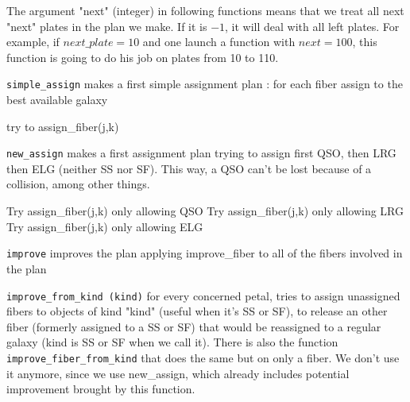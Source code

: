 \documentclass{article}
\begin{document}
The argument "next" (integer) in following functions means that we treat all next "next" plates in the plan we make. If it is $-1$, it will deal with all left plates. For example, if $next\_plate = 10$ and one launch a function with $next = 100$, this function is going to do his job on plates from 10 to 110.

{\tt simple\_assign} makes a first simple assignment plan : for each fiber assign to the best available galaxy

\begin{algorithm}[H]
	\caption{Simple\_assign(j0,n)}\label{euclid}
	\begin{algorithmic}[1]
		\State try to assign\_fiber(j,k)
		\EndFor
		\EndFor
	\end{algorithmic}
\end{algorithm}

{\tt new\_assign} makes a first assignment plan trying to assign first QSO, then LRG then ELG (neither SS nor SF). This way, a QSO can't be lost because of a collision, among other things.

\begin{algorithm}[H]
	\caption{New\_assign\_fibers(j0,n)}\label{euclid}
	\begin{algorithmic}[1]
		\State Try assign\_fiber(j,k) only allowing QSO
		\EndFor
		\State Try assign\_fiber(j,k) only allowing LRG
		\EndFor
		\State Try assign\_fiber(j,k) only allowing ELG
		\EndFor
		\EndFor
		\EndFor
	\end{algorithmic}
\end{algorithm}

{\tt improve} improves the plan applying improve\_fiber to all of the fibers involved in the plan

{\tt improve\_from\_kind (kind)} for every concerned petal, tries to assign unassigned fibers to objects of kind "kind" (useful when it's SS or SF), to release an other fiber (formerly assigned to a SS or SF) that would be reassigned to a regular galaxy (kind is SS or SF when we call it). There is also the function {\tt improve\_fiber\_from\_kind} that does the same but on only a fiber. We don't use it anymore, since we use new\_assign, which already includes potential improvement brought by this function.
\end{document}
